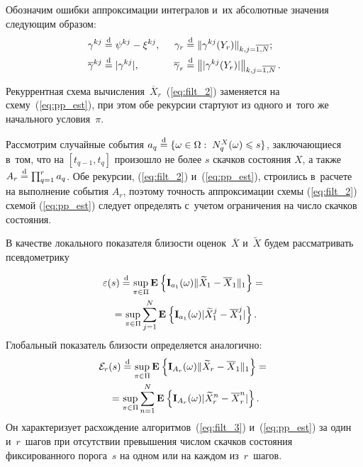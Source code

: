 \begin{multicols}{2}
  Обозначим ошибки аппроксимации интегралов и~их абсолютные значения
  сле\-ду\-ющим образом:
    \begin{alignat*}{2}
  \gamma^{kj} &\eqd \psi^{kj} - \xi^{kj}, & \enskip
 \gamma_r &\eqd \|\gamma^{kj}(Y_r)\|_{k,j=\overline{1,N}};
\\
  \overline{\gamma}^{kj} &\eqd |\gamma^{kj}|, &\enskip
 \overline{\gamma}_r &\eqd \left\||\gamma^{kj}(Y_r)|\right\|_{k,j=\overline{1,N}}.
  \end{alignat*}
 
  
  Рекуррентная схема вычисления~$\overline{X}_r$~(\ref{eq:filt_2}) 
  заменяется на схему~(\ref{eq:pp_est}), при этом обе рекурсии стартуют из 
  одного и~того же начального условия~$\pi$.
  
  Рассмотрим случайные события $a_q \stackrel{\mathrm{d}}{=} \{\omega \in \Omega:\; N^X_q(\omega) \leqslant s \}$, заключающиеся в~том, что на $[t_{q-1},t_q]$ произошло не более $s$ скачков состояния $X$, а также $A_r \stackrel{\mathrm{d}}{=} \prod_{q=1}^r a_q$. Обе рекурсии, (\ref{eq:filt_2}) и~(\ref{eq:pp_est}), строились в~расчете на выполнение события $A_r$, поэтому точность аппроксимации схемы (\ref{eq:filt_2}) схемой (\ref{eq:pp_est}) следует определять с~учетом ограничения на число скачков состояния.
  
  \columnbreak
  
  В качестве локального показателя близости оценок~$\overline{X}$ и~$\widetilde{X}$ 
  будем рассматривать псевдометрику  
  
\noindent
  \begin{multline}
 \varepsilon(s) \stackrel{\mathrm{d}}{=} \sup\limits_{\pi \in \Pi}\mathbf{E}_{  }\left\{ \mathop{\mathbf{I}_{a_1}(\omega)\|
 \widetilde{X}_{1} - \overline{X}_{1}\|_{1}} \right\} = {}\\
 {}=\sup\limits_{\pi \in \Pi}\sum\limits_{j=1}^N\mathbf{E}_{  }\left\{ \mathop{\mathbf{I}_{a_1}
 (\omega)|\widetilde{X}^j_1 - \overline{X}^j_{1}|} \right\}.
 \label{eq:num_loc}
 \end{multline}
 Глобальный показатель близости определяется аналогично:
 \begin{multline}
\mathcal{E}_r(s) \stackrel{\mathrm{d}}{=} \sup\limits_{\pi \in \Pi}\mathbf{E}_{  }\left\{ \mathop{\mathbf{I}_{A_r}
(\omega)\|\widetilde{X}_{r} - \overline{X}_{1}\|_{1}} \right\} ={}\\
{}= \sup\limits_{\pi \in \Pi}\sum\limits_{n=1}^N\mathbf{E}_{  }\left\{ \mathop{\mathbf{I}_{A_r}(\omega)|\widetilde{X}^n_r - \overline{X}^n_{r}|} \right\}.
 \label{eq:num_glob}
 \end{multline}
 Он характеризует расхождение алгоритмов~(\ref{eq:filt_3}) и~(\ref{eq:pp_est}) 
 за один и~$r$~шагов при отсутствии превышения чис\-лом скачков состояния 
 фиксированного порога~$s$ на одном или на каждом из~$r$~шагов. 
 

\end{multicols}
